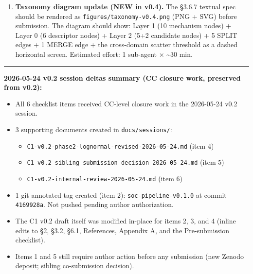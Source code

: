 \documentclass[
  11pt]{article}
\providecommand{\tightlist}{%
  \setlength{\itemsep}{0pt}\setlength{\parskip}{0pt}}
\begin{document}
\begin{enumerate}
  follow-up should: (i) replace synthetic anchors with real-data
  equivalents (priority on
  \texttt{adverse\_selection\_unraveling} comms-side BERTopic NLP,
  \texttt{gardner\_collins\_toggle\_v1} Anetzberger 2009 raw flow,
  \texttt{delay\_differential\_debt} PREDICTS / NOAA-ENSO / NSF-permafrost
  real data, \texttt{leaky\_integrate\_fire} SOEP real data,
  \texttt{anderson\_localization} published Anderson conductance
  datasets); (ii) add a second sub-agent verdict per class; (iii) revise
  pre-reg bands per the schelling-style mechanism-vs-magnitude
  distinction. Estimated effort: 10 sub-agents × \textasciitilde 60 min
  each = 10 wall-clock hours under 30-agent parallel mode.
\item
  \textbf{Taxonomy diagram update (NEW in v0.4).} The §3.6.7 textual
  spec should be rendered as
  \texttt{figures/taxonomy-v0.4.png} (PNG + SVG) before submission. The
  diagram should show: Layer 1 (10 mechanism nodes) + Layer 0
  (6 descriptor nodes) + Layer 2 (5+2 candidate nodes) + 5 SPLIT edges +
  1 MERGE edge + the cross-domain scatter threshold as a dashed
  horizontal screen. Estimated effort: 1 sub-agent × \textasciitilde 30
  min.
\end{enumerate}

\begin{center}\rule{0.5\linewidth}{0.5pt}\end{center}

\textbf{2026-05-24 v0.2 session deltas summary (CC closure work,
preserved from v0.2):}

\begin{itemize}
\tightlist
\item
  All 6 checklist items received CC-level closure work in the 2026-05-24
  v0.2 session.
\item
  3 supporting documents created in \texttt{docs/sessions/}:

  \begin{itemize}
  \tightlist
  \item
    \texttt{C1-v0.2-phase2-lognormal-revised-2026-05-24.md} (item 4)
  \item
    \texttt{C1-v0.2-sibling-submission-decision-2026-05-24.md} (item 5)
  \item
    \texttt{C1-v0.2-internal-review-2026-05-24.md} (item 6)
  \end{itemize}
\item
  1 git annotated tag created (item 2): \texttt{soc-pipeline-v0.1.0} at
  commit \texttt{4169928a}. Not pushed pending author authorization.
\item
  The C1 v0.2 draft itself was modified in-place for items 2, 3, and 4
  (inline edits to §2, §3.2, §6.1, References, Appendix A, and the
  Pre-submission checklist).
\item
  Items 1 and 5 still require author action before any submission (new
  Zenodo deposit; sibling co-submission decision).
\end{itemize}
\end{document}
